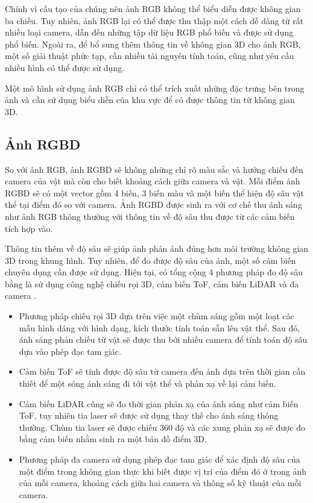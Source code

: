 Chính vì cấu tạo của chúng nên ảnh RGB không thể biểu diễn được không gian ba chiều. Tuy nhiên, ảnh RGB lại có thể được thu thập một cách dễ dàng từ rất nhiều loại camera, dẫn đến những tập dữ liệu RGB phổ biến và được sử dụng phổ biến. Ngoài ra, để bổ sung thêm thông tin về không gian 3D cho ảnh RGB, một số giải thuật phức tạp, cần nhiều tài nguyên tính toán, cũng như yêu cầu nhiều hình có thể được sử dụng.

Một mô hình sử dụng ảnh RGB chỉ có thể trích xuất những đặc trưng bên trong ảnh và cần sử dụng biểu diễn của khu vực để có được thông tin từ không gian 3D.

\subsection{Ảnh RGBD}

So với ảnh RGB, ảnh RGBD sẽ không những chỉ rõ màu sắc và hướng chiếu đến camera của vật mà còn cho biết khoảng cách giữa camera và vật. Mỗi điểm ảnh RGBD sẽ có một vector gồm 4 biến, 3 biến màu và một biến thể hiện độ sâu vật thể tại điểm đó so với camera. Ảnh RGBD được sinh ra với cơ chế thu ánh sáng như ảnh RGB thông thường với thông tin về độ sâu thu được từ các cảm biến tích hợp vào.

Thông tin thêm về độ sâu sẽ giúp ảnh phản ánh đúng hơn môi trường không gian 3D trong khung hình. Tuy nhiên, để đo được độ sâu của ảnh, một số cảm biến chuyên dụng cần được sử dụng. Hiện tại, có tổng cộng 4 phương pháp đo độ sâu bằng là sử dụng công nghệ chiếu rọi 3D, cảm biến ToF, cảm biến LiDAR và đa camera \cite{lopes2022survey}.
\begin{itemize}
    \item Phương pháp chiếu rọi 3D dựa trên việc một chùm sáng gồm một loạt các mẫu hình dáng với hình dạng, kích thước tính toán sẵn lên vật thể. Sau đó, ánh sáng phản chiếu từ vật sẽ được thu bởi nhiều camera để tính toán độ sâu dựa vào phép đạc tam giác.
    \item Cảm biến ToF sẽ tính được độ sâu từ camera đến ảnh dựa trên thời gian cần thiết để một sóng ánh sáng đi tới vật thể và phản xạ về lại cảm biến.
    \item Cảm biến LiDAR cũng sẽ đo thời gian phản xạ của ánh sáng như cảm biến ToF, tuy nhiên tia laser sẽ được sử dụng thay thế cho ánh sáng thông thường. Chùm tia laser sẽ được chiếu 360 độ và các xung phản xạ sẽ được đo bằng cảm biến nhằm sinh ra một bản đồ điểm 3D.
    \item Phương pháp đa camera sử dụng phép đạc tam giác để xác định độ sâu của một điểm trong không gian thực khi biết được vị trí của điểm đó ở trong ảnh của mỗi camera, khoảng cách giữa hai camera và thông số kỹ thuật của mỗi camera.
\end{itemize}

